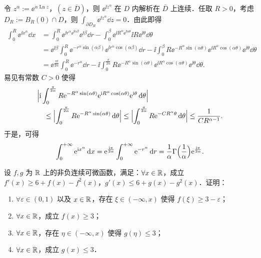 \begin{solution}
令 $z^\alpha:=\ee^{\alpha\operatorname{Ln}z}$，$(z\in\overline{D})$，则 $\ee^{\ii z^\alpha}$ 在 $D$ 内解析在 $\overline{D}$ 上连续．任取 $R>0$，考虑 $D_R:=B_R(0)\cap D$，则 $\displaystyle\int_{\partial D_R}\ee^{\ii z^\alpha}\dd z=0$．由此即得
\begin{align*}
  \int_0^R\ee^{\ii x^\alpha}\dd x
  &=\int_0^R\ee^{\ii r^\alpha\ee^{\ii\alpha\beta}}\ee^{\ii\beta}\dd r
    -\int_0^\beta\ee^{\ii R^\alpha\ee^{\ii\alpha\theta}}\ii R\ee^{\ii\theta}\dd\theta\\
  &=\ee^{\ii\beta}\int_0^R\ee^{-r^\alpha\sin(\alpha\beta)}\ee^{\ii r^\alpha\cos(\alpha\beta)}\dd r
    -\ii\int_0^\beta R\ee^{-R^\alpha\sin(\alpha\theta)}\ee^{\ii R^\alpha\cos(\alpha\theta)}\ee^{\ii\theta}\dd\theta\\
  &=\ee^{\frac{\pi\ii}{2\alpha}}\int_0^R\ee^{-r^\alpha}\dd r
    -\ii\int_0^{\frac{\pi}{2\alpha}}R\ee^{-R^\alpha\sin(\alpha\theta)}\ee^{\ii R^\alpha\cos(\alpha\theta)}\ee^{\ii\theta}\dd\theta.
\end{align*}
易见有常数 $C>0$ 使得
\begin{align*}
  &\Bigl|\mathrm{i}\int_0^{\frac{\pi}{2\alpha}}R\mathrm{e}^{-R^\alpha\sin(\alpha\theta)}
    \mathrm{e}^{\mathrm{i} R^\alpha\cos(\alpha\theta)}\mathrm{e}^{\mathrm{i}\theta}\,\mathrm{d}\theta\Bigr|\\
  &\quad\le\Bigl|\int_0^{\frac{\pi}{2\alpha}}R\mathrm{e}^{-R^\alpha\sin(\alpha\theta)}\,\mathrm{d}\theta\Bigr|
   \le\Bigl|\int_0^{\frac{\pi}{2\alpha}}R\mathrm{e}^{-CR^\alpha\theta}\,\mathrm{d}\theta\Bigr|
   \le\frac{1}{CR^{\alpha-1}}.
\end{align*}
于是，可得
\[
  \int_0^{+\infty}\mathrm{e}^{\mathrm{i} x^\alpha}\,\mathrm{d} x
  =\mathrm{e}^{\frac{\mathrm{i}\pi}{2\alpha}}\int_0^{+\infty}\mathrm{e}^{-r^\alpha}\,\mathrm{d} r
  =\frac{1}{\alpha}\Gamma\Bigl(\frac{1}{\alpha}\Bigr)\mathrm{e}^{\frac{\mathrm{i}\pi}{2\alpha}}.
\]
\end{solution}

设 $f,g$ 为 $\mathbb{R}$ 上的非负连续可微函数，满足：$\forall x\in\mathbb{R}$，成立 $f'(x)\ge 6+f(x)-f^2(x)$，$g'(x)\le 6+g(x)-g^2(x)$．证明：
\begin{enumerate}[label=(\arabic*)]
  \item $\forall\varepsilon\in(0,1)$ 以及 $x\in\mathbb{R}$，存在 $\xi\in(-\infty,x)$ 使得 $f(\xi)\ge 3-\varepsilon$；
  \item $\forall x\in\mathbb{R}$，成立 $f(x)\ge 3$；
  \item $\forall x\in\mathbb{R}$，存在 $\eta\in(-\infty,x)$ 使得 $g(\eta)\le 3$；
  \item $\forall x\in\mathbb{R}$，成立 $g(x)\le 3$．
\end{enumerate}

